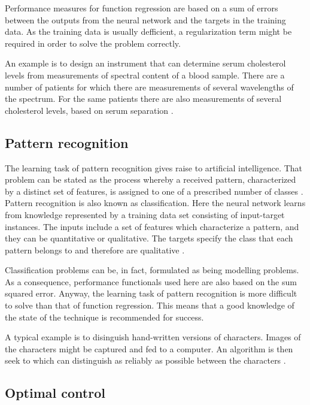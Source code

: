 Performance measures for function regression are based on a sum of errors between the outputs from the neural network and the targets in the training data. 
As the training data is usually defficient, a regularization term might be required in order to solve the problem correctly.  

An example is to design an instrument that can determine serum cholesterol levels from
measurements of spectral content of a blood sample. There are a number of 
patients for which there are measurements of several wavelengths of the spectrum.
For the same patients there are also measurements of several
cholesterol levels, based on serum separation \cite{Demuth2009}. 

\subsection{Pattern recognition}

The learning task of pattern recognition gives raise to artificial intelligence. That problem can be stated as
the process whereby a received pattern, characterized by a distinct
set of features, is assigned to one of a prescribed number of
classes \cite{Haykin1994}. Pattern recognition is also known as classification. Here
the neural network learns from knowledge represented by a training
data set consisting of input-target instances. The inputs include a
set of features which characterize a pattern, and they can be quantitative or qualitative. The targets specify
the class that each pattern belongs to and therefore are qualitative \cite{Bishop1995}.

Classification problems can be, in fact, formulated as being modelling problems. 
As a consequence, performance functionals used here are also based on the sum squared error. 
Anyway, the learning task of pattern recognition is more difficult to solve than that of function regression. 
This means that a good knowledge of the state of the technique is recommended for success. 

A typical example is to disinguish hand-written versions of characters. 
Images of the characters might be captured and fed to a computer. 
An algorithm is then seek to which can distinguish as reliably as possible between the characters \cite{Bishop1995}. 

\subsection{Optimal control}

